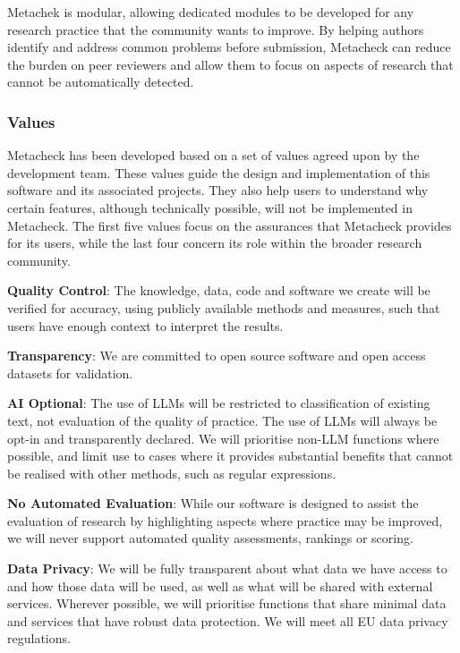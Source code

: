 \documentclass[
  letterpaper,
  12pt]{article}
\begin{document}
Metachek is modular, allowing dedicated modules to be developed for any
research practice that the community wants to improve. By helping
authors identify and address common problems before submission,
Metacheck can reduce the burden on peer reviewers and allow them to
focus on aspects of research that cannot be automatically detected.

\subsubsection{Values}\label{values}

Metacheck has been developed based on a set of values agreed upon by the
development team. These values guide the design and implementation of
this software and its associated projects. They also help users to
understand why certain features, although technically possible, will not
be implemented in Metacheck. The first five values focus on the
assurances that Metacheck provides for its users, while the last four
concern its role within the broader research community.

\textbf{Quality Control}: The knowledge, data, code and software we
create will be verified for accuracy, using publicly available methods
and measures, such that users have enough context to interpret the
results.

\textbf{Transparency}: We are committed to open source software and open
access datasets for validation.

\textbf{AI Optional}: The use of LLMs will be restricted to
classification of existing text, not evaluation of the quality of
practice. The use of LLMs will always be opt-in and transparently
declared. We will prioritise non-LLM functions where possible, and limit
use to cases where it provides substantial benefits that cannot be
realised with other methods, such as regular expressions.

\textbf{No Automated Evaluation}: While our software is designed to
assist the evaluation of research by highlighting aspects where practice
may be improved, we will never support automated quality assessments,
rankings or scoring.

\textbf{Data Privacy}: We will be fully transparent about what data we
have access to and how those data will be used, as well as what will be
shared with external services. Wherever possible, we will prioritise
functions that share minimal data and services that have robust data
protection. We will meet all EU data privacy regulations.
\end{document}
